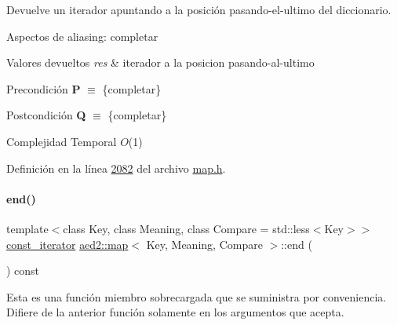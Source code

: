 Devuelve un iterador apuntando a la posición pasando-\/el-\/ultimo del diccionario. 

\begin{DoxyParagraph}{Aspectos de aliasing\+:}
completar
\end{DoxyParagraph}

\begin{DoxyRetVals}{Valores devueltos}
{\em res} & iterador a la posicion pasando-\/al-\/ultimo\\
\hline
\end{DoxyRetVals}
\begin{DoxyPrecond}{Precondición}
{\bfseries P} $\equiv$ \{completar\} 
\end{DoxyPrecond}
\begin{DoxyPostcond}{Postcondición}
{\bfseries Q} $\equiv$ \{completar\}
\end{DoxyPostcond}

\begin{DoxyDescription}
\item[Complejidad Temporal]$O$(1)
\end{DoxyDescription}

Definición en la línea \hyperlink{map_8h_source_l02082}{2082} del archivo \hyperlink{map_8h_source}{map.\+h}.

\mbox{\label{classaed2_1_1map_a91e7cad1a638c55659c169d5574cd5d7_a91e7cad1a638c55659c169d5574cd5d7}} 
\paragraph{\texorpdfstring{end()}{end()}\hspace{0.1cm}{\footnotesize\ttfamily [2/2]}}
{\footnotesize\ttfamily template$<$class Key, class Meaning, class Compare = std\+::less$<$\+Key$>$$>$ \\
\hyperlink{classaed2_1_1map_1_1const__iterator}{const\+\_\+iterator} \hyperlink{classaed2_1_1map}{aed2\+::map}$<$ Key, Meaning, Compare $>$\+::end (\begin{DoxyParamCaption}{ }\end{DoxyParamCaption}) const\hspace{0.3cm}{\ttfamily [inline]}}

Esta es una función miembro sobrecargada que se suministra por conveniencia. Difiere de la anterior función solamente en los argumentos que acepta. 

